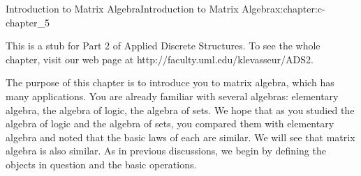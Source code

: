 \documentclass[oneside,10pt,]{book}
\numberwithin{equation}{section}
\begin{document}
\begin{chapterptx}{Introduction to Matrix Algebra}{}{Introduction to Matrix Algebra}{}{}{x:chapter:c-chapter_5}
\begin{introduction}{}%
This is a stub for Part 2 of Applied Discrete Structures. To see the whole chapter, visit our web page at http:\slash{}\slash{}faculty.uml.edu\slash{}klevasseur\slash{}ADS2.%
\par
The purpose of this chapter is to introduce you to matrix algebra, which has many applications. You are already familiar with several algebras: elementary algebra, the algebra of logic, the algebra of sets. We hope that as you studied the algebra of logic and the algebra of sets, you compared them with elementary algebra and noted that the basic laws of each are similar. We will see that matrix algebra is also similar. As in previous discussions, we begin by defining the objects in question and the basic operations.%
\end{introduction}%
\end{chapterptx}
%
%
\typeout{************************************************}
\typeout{************************************************}
%
\end{document}
